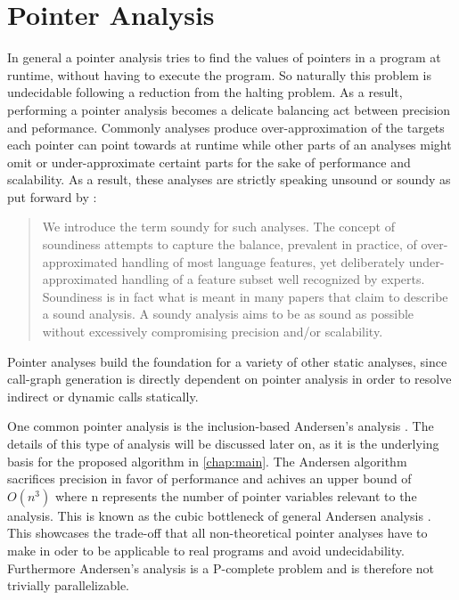 \section{Pointer Analysis}\label{sec:pta}
In general a pointer analysis tries to find the values of pointers in a program at runtime, without having to execute the program.
So naturally this problem is undecidable \cite{landi1992undecidability} following a reduction from the halting problem.
As a result, performing a pointer analysis becomes a delicate balancing act between precision and peformance.
Commonly analyses produce over-approximation of the targets each pointer can point towards at runtime while other parts of an analyses might omit or under-approximate certaint parts for the sake of performance and scalability.
As a result, these analyses are strictly speaking unsound or soundy as put forward by \cite{livshits2015defense}:

\begin{quote}
    We introduce the term soundy for
    such analyses. The concept of soundiness
    attempts to capture the balance,
    prevalent in practice, of over-approximated
    handling of most language features, yet deliberately
    under-approximated handling of a feature subset well
    recognized by experts. Soundiness is in
    fact what is meant in many papers that
    claim to describe a sound analysis. A
    soundy analysis aims to be as sound as
    possible without excessively compromising
    precision and/or scalability.
\end{quote}

Pointer analyses build the foundation for a variety of other static analyses, since call-graph generation is directly dependent on pointer analysis in order to resolve indirect or dynamic calls statically.

One common pointer analysis is the inclusion-based Andersen's analysis \cite{andersen1994program}. The details of this type of analysis will be discussed later on, as it is the underlying basis for the proposed algorithm in \autoref{chap:main}. The Andersen algorithm sacrifices precision in favor of performance and achives an upper bound of $O(n^3)$ where n represents the number of pointer variables relevant to the analysis. This is known as the cubic bottleneck of general Andersen analysis \cite{mathiasen2021fine}.
This showcases the trade-off that all non-theoretical pointer analyses have to make in oder to be applicable to real programs and avoid undecidability. Furthermore Andersen's analysis is a P-complete problem and is therefore not trivially parallelizable.

